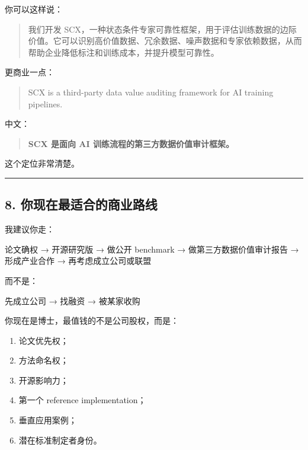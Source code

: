 \documentclass[
  12pt,
]{ctexart}
\newenvironment{Shaded}{}{}
\newcommand{\NormalTok}[1]{#1}
\providecommand{\tightlist}{%
  \setlength{\itemsep}{0pt}\setlength{\parskip}{0pt}}
\begin{document}
你可以这样说：

\begin{quote}
我们开发
SCX，一种状态条件专家可靠性框架，用于评估训练数据的边际价值。它可以识别高价值数据、冗余数据、噪声数据和专家依赖数据，从而帮助企业降低标注和训练成本，并提升模型可靠性。
\end{quote}

更商业一点：

\begin{quote}
SCX is a third-party data value auditing framework for AI training
pipelines.
\end{quote}

中文：

\begin{quote}
\textbf{SCX 是面向 AI 训练流程的第三方数据价值审计框架。}
\end{quote}

这个定位非常清楚。

\begin{center}\rule{0.5\linewidth}{0.5pt}\end{center}

\subsection{8.
你现在最适合的商业路线}\label{ux4f60ux73b0ux5728ux6700ux9002ux5408ux7684ux5546ux4e1aux8defux7ebf}

我建议你走：

\begin{Shaded}
\begin{Highlighting}[]
\NormalTok{论文确权}
\NormalTok{→ 开源研究版}
\NormalTok{→ 做公开 benchmark}
\NormalTok{→ 做第三方数据价值审计报告}
\NormalTok{→ 形成产业合作}
\NormalTok{→ 再考虑成立公司或联盟}
\end{Highlighting}
\end{Shaded}

而不是：

\begin{Shaded}
\begin{Highlighting}[]
\NormalTok{先成立公司}
\NormalTok{→ 找融资}
\NormalTok{→ 被某家收购}
\end{Highlighting}
\end{Shaded}

你现在是博士，最值钱的不是公司股权，而是：

\begin{enumerate}
\def\labelenumi{\arabic{enumi}.}
\tightlist
\item
  论文优先权；
\item
  方法命名权；
\item
  开源影响力；
\item
  第一个 reference implementation；
\item
  垂直应用案例；
\item
  潜在标准制定者身份。
\end{enumerate}
\end{document}
